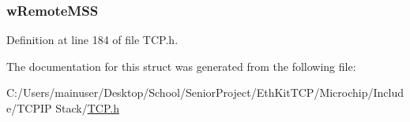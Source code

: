 \hypertarget{struct_t_c_b_a3a4e74a03e65f7f665046aaac3127228}{}
\subsubsection[{w\+Remote\+M\+S\+S}]{ w\+Remote\+M\+S\+S}\label{struct_t_c_b_a3a4e74a03e65f7f665046aaac3127228}


Definition at line 184 of file T\+C\+P.\+h.



The documentation for this struct was generated from the following file\+:\begin{DoxyCompactItemize}
\item 
C\+:/\+Users/mainuser/\+Desktop/\+School/\+Senior\+Project/\+Eth\+Kit\+T\+C\+P/\+Microchip/\+Include/\+T\+C\+P\+I\+P Stack/\hyperlink{_t_c_p_8h}{T\+C\+P.\+h}\end{DoxyCompactItemize}
